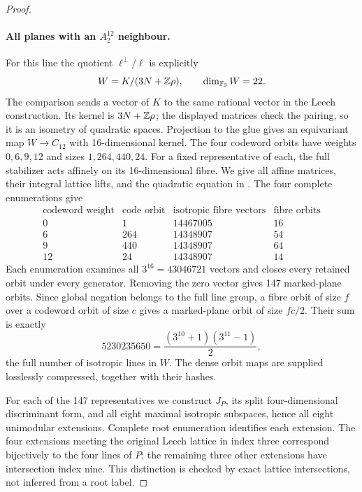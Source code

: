 \begin{proof}
\paragraph{All planes with an \(A_2^{12}\) neighbour.}
For this line the quotient \(\ell^\perp/\ell\) is explicitly
\[
 W=K/(3N+\mathbb Z\rho),\qquad\dim_{\mathbb F_3}W=22.
\]
The comparison sends a vector of \(K\) to the same rational vector
in the Leech construction. Its kernel is \(3N+\mathbb Z\rho\); the
displayed matrices check the pairing, so it is an isometry of
quadratic spaces. Projection to the glue gives an equivariant
map \(W\to C_{12}\) with 16-dimensional kernel. The four codeword
orbits have weights \(0,6,9,12\) and sizes \(1,264,440,24\).
For a fixed representative of each, the full stabilizer acts
affinely on its 16-dimensional fibre. We give all affine matrices,
their integral lattice lifts, and the quadratic equation in
. The four complete enumerations give
\[
\begin{array}{c|r|r|r}
\text{codeword weight}&\text{code orbit}&
 \text{isotropic fibre vectors}&\text{fibre orbits}\\\hline
0&1&14467005&16\\
6&264&14348907&54\\
9&440&14348907&64\\
12&24&14348907&14
\end{array}
\]
Each enumeration examines all \(3^{16}=43046721\) vectors and
closes every retained orbit under every generator. Removing the
zero vector gives 147 marked-plane orbits. Since global negation
belongs to the full line group, a fibre orbit of size \(f\) over
a codeword orbit of size \(c\) gives a marked-plane orbit of size
\(fc/2\). Their sum is exactly
\[
 5230235650
   =\frac{(3^{10}+1)(3^{11}-1)}2,
\]
the full number of isotropic lines in \(W\). The dense orbit maps
are supplied losslessly compressed, together with their hashes.

For each of the 147 representatives we construct \(J_P\), its
split four-dimensional discriminant form, and all eight maximal
isotropic subspaces, hence all eight unimodular extensions. Complete
root enumeration identifies each extension. The four extensions
meeting the original Leech lattice in index three correspond
bijectively to the four lines of \(P\); the remaining three other
extensions have intersection index nine. This distinction is
checked by exact lattice intersections, not inferred from a root
label.


\end{proof}
